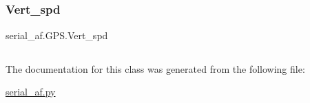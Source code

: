 \subsection*{}

\mbox{\label{classserial__af_1_1_g_p_s_a56b941265fe961948501d6e9891fb206}} 
\subsubsection{\texorpdfstring{Vert\+\_\+spd}{Vert\_spd}}
{\footnotesize\ttfamily serial\+\_\+af.\+G\+P\+S.\+Vert\+\_\+spd}



\subsection*{}



The documentation for this class was generated from the following file\+:\begin{DoxyCompactItemize}
\item 
\hyperlink{serial__af_8py}{serial\+\_\+af.\+py}\end{DoxyCompactItemize}
